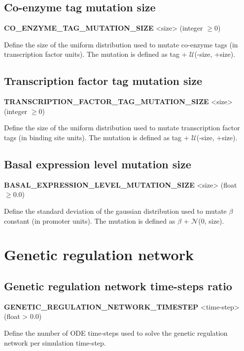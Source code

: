 
\subsection{Co-enzyme tag mutation size}
\begin{center}
{\bf CO\_ENZYME\_TAG\_MUTATION\_SIZE} <size> (integer $\ge 0$)
\end{center}
Define the size of the uniform distribution used to mutate co-enzyme tags (in transcription factor units). The mutation is defined as tag + $\mathcal{U}$(-size, +size).


\subsection{Transcription factor tag mutation size}
\begin{center}
{\bf TRANSCRIPTION\_FACTOR\_TAG\_MUTATION\_SIZE} <size> (integer $\ge 0$)
\end{center}
Define the size of the uniform distribution used to mutate transcription factor tags (in binding site units). The mutation is defined as tag + $\mathcal{U}$(-size, +size).


\subsection{Basal expression level mutation size}
\begin{center}
{\bf BASAL\_EXPRESSION\_LEVEL\_MUTATION\_SIZE} <size> (float $\ge 0.0$)
\end{center}
Define the standard deviation of the gaussian distribution used to mutate $\beta$ constant (in promoter units). The mutation is defined as $\beta$ + $\mathcal{N}$(0, size).


\section{Genetic regulation network}

\subsection{Genetic regulation network time-steps ratio}
\begin{center}
{\bf GENETIC\_REGULATION\_NETWORK\_TIMESTEP} <time-step> (float > 0.0)
\end{center}
Define the number of ODE time-steps used to solve the genetic regulation network per simulation time-step.

